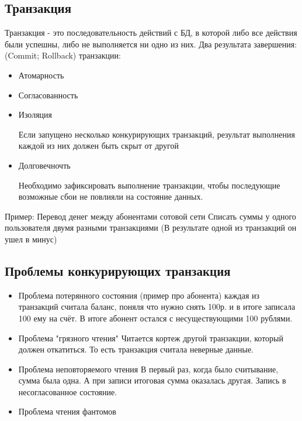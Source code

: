 \documentclass{article}
\begin{document}
\subsection{Транзакция}
Транзакция - это последовательность действий с БД, в которой либо все действия были успешны, либо не выполняется ни одно из них.
\newline
{} 
Два результата завершения: (Commit; Rollback)
 транзакции: 
\begin{itemize}
    \item Атомарность
    \item Согласованность
    \item Изоляция
    \par Если запущено несколько конкурирующих транзакций, результат выполнения каждой из них должен быть скрыт от другой
    \item Долговечночть 
    \par Необходимо зафиксировать выполнение транзакции, чтобы последующие возможные сбои не повлияли на состояние данных.
\end{itemize}
Пример: Перевод денег между абонентами сотовой сети
\newline Списать суммы у одного пользователя двумя разными транзакциями 
\newline(В результате одной из транзакций он ушел в минус)

\subsection{Проблемы конкурирующих транзакция}

\begin{itemize}
    \item Проблема потерянного состояния
    \newline (пример про абонента) каждая из транзакций считала баланс, поняля что нужно снять 100р. и в итоге записала 100 ему на счёт.
    \newline В итоге абонент остался с несуществующими 100 рублями.
    \item Проблема "грязного чтения" 
    \newline Читается кортеж другой транзакции, который должен откатиться. То есть транзакция считала неверные данные.
    \item Проблема неповторяемого чтения
    \newline В первый раз, когда было считывание, сумма была одна. А при записи итоговая сумма оказалась другая. Запись в несогласованное состояние. 
    \item Проблема чтения фантомов 
\end{itemize}
\end{document}
